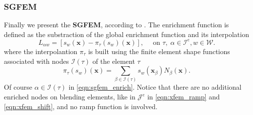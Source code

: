 \documentclass[preprint,12pt,authoryear]{elsarticle}
\newcommand{\bx}{\mathbf{x}}
\begin{document}
\subsubsection{SGFEM}
Finally we present the \textbf{SGFEM}, according to \cite{sgfem2013}. The enrichment function is defined
as the substraction of the global enrichment function and its interpolation 
\begin{equation} \label{eqn:sgfem_enrich}
    L_{\alpha w} = \left[s_w(\bx) - \pi_\tau (s_w)(\bx)\right],
    \quad \textrm{ on } \tau,\; \alpha\in\mathcal{I}^e, w\in\mathcal{W}.
\end{equation} 
where the interpolantion $\pi_\tau$ is built using the finite element shape functions
associated with nodes $\mathcal{I}(\tau)$ of the element $\tau$
\begin{equation} \label{eqn:sgfem_interpolation}
    \pi_\tau (s_w)(\bx) = \sum\limits_{\beta\in\mathcal{I}(\tau)} s_w(\bx_\beta) N_\beta(\bx).
\end{equation}
Of course $\alpha\in\mathcal{I}(\tau)$ in \eqref{eqn:sgfem_enrich}.
Notice that there are no additional enriched nodes on blending elements, like in $\mathcal{J}^e$ in 
\eqref{eqn:xfem_ramp} and \eqref{eqn:xfem_shift}, and no ramp function is involved.
\end{document}
